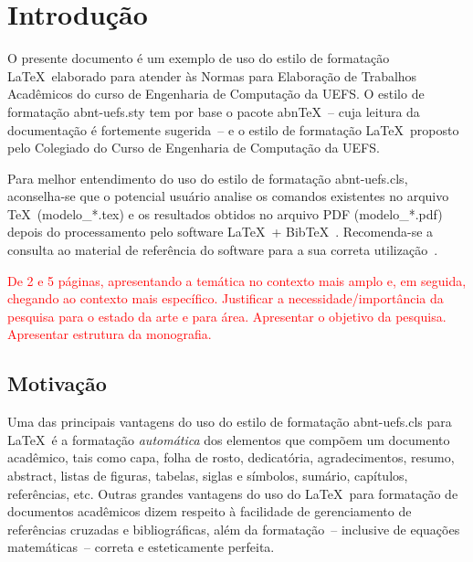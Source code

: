 \chapter{Introdu\c{c}\~ao}
O presente documento \'e um exemplo de uso do estilo de formata\c{c}\~ao \LaTeX\ elaborado para atender \`as Normas para Elabora\c{c}\~ao de Trabalhos Acad\^emicos do curso de Engenharia de Computa\c{c}\~ao da UEFS. O estilo de formata\c{c}\~ao {\ttfamily abnt-uefs.sty} tem por base o pacote abn\TeX~-- cuja leitura da documenta\c{c}\~ao \cite{abnTeX2009} \'e fortemente sugerida~-- e o estilo de formata\c{c}\~ao \LaTeX\ proposto pelo Colegiado do Curso de Engenharia de Computa\c{c}\~ao da UEFS.

Para melhor entendimento do uso do estilo de formata\c{c}\~ao {\ttfamily abnt-uefs.cls}, aconselha-se que o potencial usu\'ario analise os comandos existentes no arquivo \TeX\ ({\ttfamily modelo\_*.tex}) e os resultados obtidos no arquivo PDF ({\ttfamily modelo\_*.pdf}) depois do processamento pelo software \LaTeX\ + Bib\TeX~\cite{LaTeX2009,BibTeX2009}. Recomenda-se a consulta ao material de refer\^encia do software para a sua correta utiliza\c{c}\~ao~\cite{Lamport1986,Buerger1989,Kopka2003,Mittelbach2004}.

\textcolor{red}{De 2 e 5 p\'aginas, apresentando a tem\'atica no contexto mais amplo e, em
seguida, chegando ao contexto mais espec\'ifico. Justificar a necessidade/import\^ancia
da pesquisa para o estado da arte e para área. Apresentar o objetivo da pesquisa.
Apresentar estrutura da monografia.
}

\section{Motiva\c{c}\~ao}

Uma das principais vantagens do uso do estilo de formata\c{c}\~ao {\ttfamily abnt-uefs.cls} para \LaTeX\ \'e a formata\c{c}\~ao \textit{autom\'atica} dos elementos que comp\~oem um documento acad\^emico, tais como capa, folha de rosto, dedicat\'oria, agradecimentos, resumo, abstract, listas de figuras, tabelas, siglas e s\'imbolos, sum\'ario, cap\'itulos, refer\^encias, etc. Outras grandes vantagens do uso do \LaTeX\ para formata\c{c}\~ao de documentos acad\^emicos dizem respeito \`a facilidade de gerenciamento de refer\^encias cruzadas e bibliogr\'aficas, al\'em da formata\c{c}\~ao~-- inclusive de equa\c{c}\~oes  matem\'aticas~-- correta e esteticamente perfeita.

